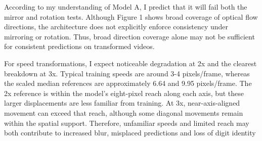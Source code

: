 According to my understanding of Model A, I predict that it will fail both the mirror and rotation tests. Although Figure 1 shows broad coverage of optical flow directions, the architecture does not explicitly enforce consistency under mirroring or rotation. Thus, broad direction coverage alone may not be sufficient for consistent predictions on transformed videos.

For speed transformations, I expect noticeable degradation at 2x and the clearest breakdown at 3x. Typical training speeds are around 3-4 pixels/frame, whereas the scaled median references are approximately 6.64 and 9.95 pixels/frame. The 2x reference is within the model's eight-pixel reach along each axis, but these larger displacements are less familiar from training. At 3x, near-axis-aligned movement can exceed that reach, although some diagonal movements remain within the spatial support. Therefore, unfamiliar speeds and limited reach may both contribute to increased blur, misplaced predictions and loss of digit identity
